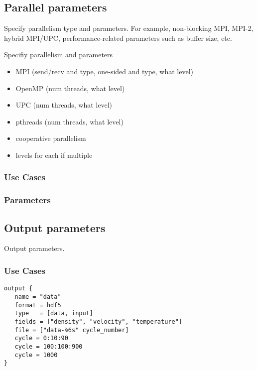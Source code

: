 \subsection{Parallel parameters} \label{ss:params-parallel}

Specify parallelism type and parameters.  For example, non-blocking
MPI, MPI-2, hybrid MPI/UPC, performance-related parameters such as
buffer size, etc.

Specifiy parallelism and parameters

\begin{itemize}
\item MPI (send/recv and type, one-sided and type, what level)
\item OpenMP (num threads, what level)
\item UPC (num threads, what level)
\item pthreads (num threads, what level)
\item cooperative parallelism
\item levels for each if multiple
\end{itemize}


\subsubsection{Use Cases}
\subsubsection{Parameters}


\subsection{Output parameters} \label{ss:params-output}

Output parameters.


\subsubsection{Use Cases}


\begin{verbatim}
output { 
   name = "data"
   format = hdf5
   type   = [data, input]
   fields = ["density", "velocity", "temperature"]
   file = ["data-%6s" cycle_number]
   cycle = 0:10:90
   cycle = 100:100:900
   cycle = 1000
}
\end{verbatim}

